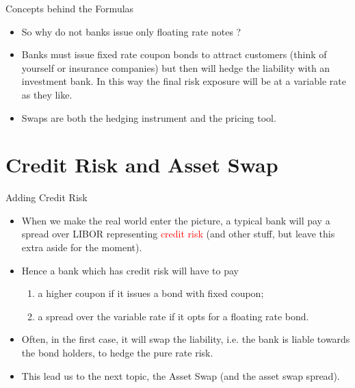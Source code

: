 \documentclass{beamer}
\begin{document}
\begin{frame}{Concepts behind the Formulas}
	\begin{itemize}
		\item So why do not banks issue only floating rate notes ?
		\item Banks must issue fixed rate coupon bonds to attract customers (think of yourself or insurance companies) but then will hedge the liability  with an investment bank. In this way the final risk exposure will be at a variable rate as they like. 
		\item Swaps are both the hedging instrument and the pricing tool.%
	\end{itemize}
\end{frame}

\section{Credit Risk and Asset Swap}
\begin{frame}{Adding Credit Risk}
	\begin{itemize}
		\item When we make the real world enter the picture, a typical bank will pay a spread over LIBOR representing \textcolor{red}{credit risk} (and other stuff, but leave this extra aside for the moment). 
		\item<2-> Hence a bank which has credit risk will have to pay
		\begin{enumerate}
			\item a higher coupon if it issues a bond with fixed coupon;
			\item a spread over the variable rate if it opts for a floating rate bond.
		\end{enumerate}
		\item<3-> Often, in the first case, it will swap the liability, i.e. the bank is liable towards the bond holders, to hedge the pure rate risk. 
		\item<4-> This lead us to the next topic, the Asset Swap (and the asset swap spread).
	\end{itemize}
\end{frame}
\end{document}
